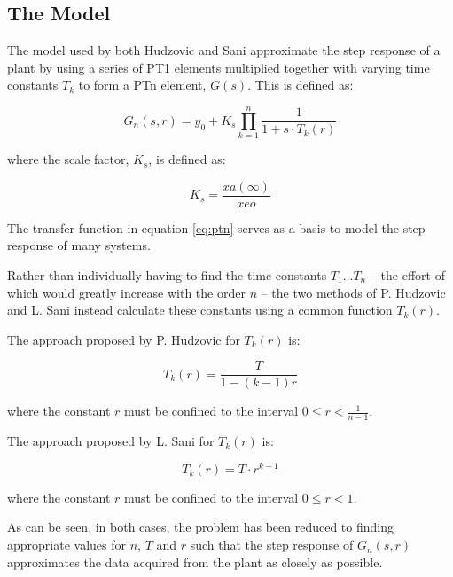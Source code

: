 \subsection{The Model}

The  model  used  by  both  Hudzovic\cite{ref:hudzovic}  and Sani\cite{ref:sani}
approximate  the  step  response of a plant by using a series  of  PT1  elements
multiplied  together with varying time constants $T_k$ to form  a  PTn  element,
$G(s)$. This is defined as:

\begin{equation}
    G_n(s,r) = y_0 + K_s \prod_{k=1}^{n} \frac{1}{1+s \cdot T_k(r)}
    \label{eq:ptn}
\end{equation}

where the scale factor, $K_s$, is defined as:

\begin{equation}
    K_s = \frac{xa(\infty)}{xeo}
\end{equation}

The  transfer function in equation \ref{eq:ptn} serves as a basis to  model  the
step response of many systems.

Rather than individually having to find the time constants  $T_1\ldots  T_n$  --
the effort of which would greatly increase with the order $n$ -- the two methods
of  P.  Hudzovic  and  L.  Sani instead calculate these constants using a common
function $T_k(r)$.

The  approach  proposed  by  P.  Hudzovic\cite{ref:hudzovic}  for  $T_k(r)$  is:

\begin{equation}
    T_k(r) = \frac{T}{1 - (k-1)r}
    \label{eq:hudzovic}
\end{equation}

where  the  constant  $r$  must  be   confined  to  the  interval  $0  \le  r  <
\frac{1}{n-1}$.

The   approach   proposed   by   L.   Sani\cite{ref:sani}   for   $T_k(r)$   is:

\begin{equation}
    T_k(r) = T \cdot r^{k-1}
    \label{eq:sani}
\end{equation}

where  the  constant $r$ must be confined to  the  interval  $0  \leq  r  <  1$.

As  can  be  seen,  in both cases, the  problem  has  been  reduced  to  finding
appropriate values for  $n$,  $T$  and  $r$  such  that  the  step  response  of
$G_n(s,r)$ approximates the data acquired from the plant as closely as possible.

